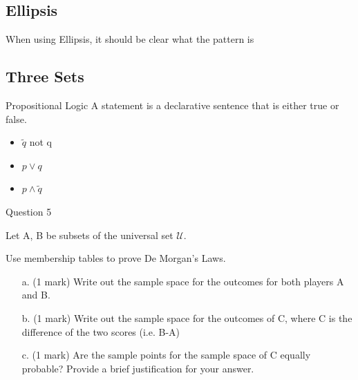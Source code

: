 \documentclass[]{report}
\begin{document}
\begin{enumerate}
\newpage



\subsection{Ellipsis}

When using Ellipsis, it should be clear what the pattern is













\subsection*{ Three Sets }






Propositional Logic A statement is a declarative sentence that
is either true or false.
\begin{itemize}
\item $\tilde q$ not q \item $p \vee q$ \item $p \wedge \tilde
q$
\end{itemize}




Question 5


Let A, B be subsets of the universal set $\mathcal{U}$.

Use membership tables to prove De Morgan's Laws.


%
%
%


\begin{itemize}
\item[a.] (1 mark) Write out the sample space for the outcomes for both players A and B.
\item[b.] (1 mark) Write out the sample space for the outcomes of C, where C is the difference of the two scores (i.e. B-A)
\item[c.] (1 mark) Are the sample points for the sample space of C equally probable? Provide a brief justification for your answer.
\end{itemize}


\end{enumerate}
\end{document}
